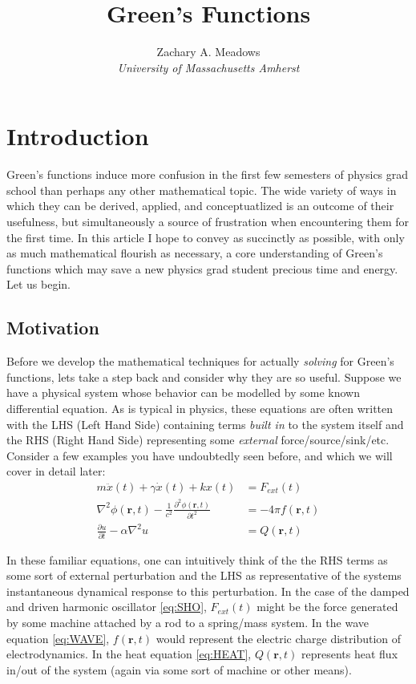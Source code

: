 \documentclass[11pt]{article}
\theoremstyle{plain}
\theoremstyle{definition}
\renewcommand{\vec}[1]{\mathbf{#1}} %
\begin{document}
\title{Green's Functions}
\author{Zachary A. Meadows \\ \textit{University of Massachusetts Amherst}}
\maketitle
\tableofcontents

\section{Introduction}

Green's functions induce more confusion in the first few semesters of physics grad school than perhaps any other mathematical topic. The wide variety of ways in which they can be derived, applied, and conceptuatlized is an outcome of their usefulness, but simultaneously a source of frustration when encountering them for the first time. In this article I hope to convey as succinctly as possible, with only as much mathematical flourish as necessary, a core understanding of Green's functions which may save a new physics grad student precious time and energy. Let us begin.

\subsection{Motivation}
Before we develop the mathematical techniques for actually \textit{solving} for Green's functions, lets take a step back and consider why they are so useful. Suppose we have a physical system whose behavior can be modelled by some known differential equation. As is typical in physics, these equations are often written with the LHS (Left Hand Side) containing terms \textit{built in} to the system itself and the RHS (Right Hand Side) representing some \textit{external} force/source/sink/etc. Consider a few examples you have undoubtedly seen before, and which we will cover in detail later:
%
\begin{align}
    m\ddot x(t) + \gamma \dot x(t) + kx(t) &= F_{ext}(t) \label{eq:SHO} \\
    \nabla^2 \phi(\vec r, t) - \frac{1}{c^2}\frac{\partial^2 \phi(\vec r, t)}{\partial t^2} &= -4\pi f(\vec r, t) \label{eq:WAVE} \\
    \frac{\partial u}{\partial t} - \alpha \nabla^2 u &= Q(\vec r, t) \label{eq:HEAT}
\end{align}

In these familiar equations, one can intuitively think of the the RHS terms as some sort of external perturbation and the LHS as representative of the systems instantaneous dynamical response to this perturbation. In the case of the damped and driven harmonic oscillator \eqref{eq:SHO}, $F_{ext}(t)$ might be the force generated by some machine attached by a rod to a spring/mass system. In the wave equation \eqref{eq:WAVE}, $f(\vec r,t)$ would represent the electric charge distribution of electrodynamics. In the heat equation \eqref{eq:HEAT}, $Q(\vec r, t)$ represents heat flux in/out of the system (again via some sort of machine or other means).
\end{document}
